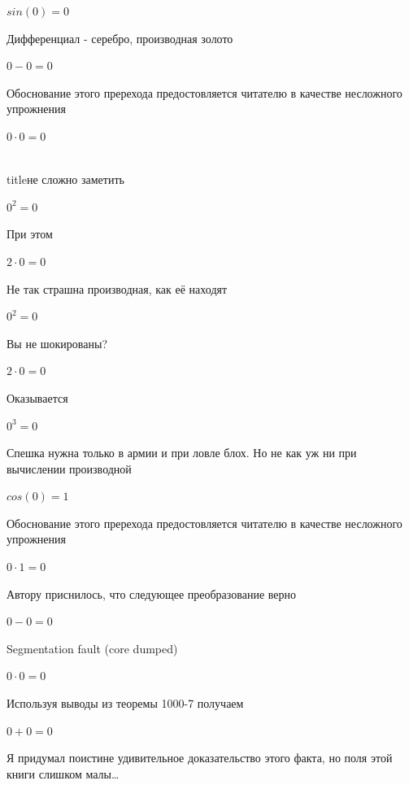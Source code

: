 \documentclass[12pt,a4paper,fleqn]{article}
\begin{document}
\begin{center}$sin(0) = 0$\end{center}
Дифференциал - серебро, производная золото\cite{link2}

\begin{center}$0-0 = 0$\end{center}
Обоснование этого пререхода предостовляется читателю в качестве несложного упрожнения

\begin{center}$0 \cdot 0 = 0$\end{center}
\\ title{не сложно заметить} 

\begin{center}$0^{2} = 0$\end{center}
При этом

\begin{center}$2 \cdot 0 = 0$\end{center}
Не так страшна производная, как её находят\cite{link2}

\begin{center}$0^{2} = 0$\end{center}
Вы не шокированы?\cite{link3}

\begin{center}$2 \cdot 0 = 0$\end{center}
Оказывается

\begin{center}$0^{3} = 0$\end{center}
Спешка нужна только в армии и при ловле блох. Но не как уж ни при вычислении производной\cite{link2}

\begin{center}$cos(0) = 1$\end{center}
Обоснование этого пререхода предостовляется читателю в качестве несложного упрожнения

\begin{center}$0 \cdot 1 = 0$\end{center}
Автору приснилось, что следующее преобразование верно

\begin{center}$0-0 = 0$\end{center}
Segmentation fault (core dumped)

\begin{center}$0 \cdot 0 = 0$\end{center}
Используя выводы из теоремы 1000-7 получаем

\begin{center}$0+0 = 0$\end{center}
Я придумал поистине удивительное доказательство этого факта, но поля этой книги слишком малы\ldots
\end{document}
